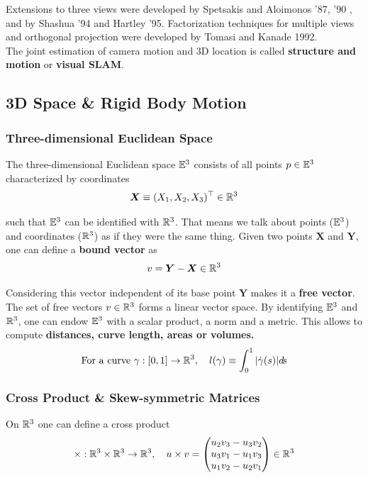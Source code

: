 Extensions to three views were developed by Spetsakis and Aloimonos '87, '90
, and by Shashua '94 and Hartley '95.
Factorization techniques for multiple views and orthogonal projection were
developed by Tomasi and Kanade 1992.\\

The joint estimation of camera motion and 3D location is called
\textbf{structure and motion} or \textbf{visual SLAM}.


\subsection{3D Space \& Rigid Body Motion}%
\label{sub:3d_space_rigid_body_motion}


\subsubsection{Three-dimensional Euclidean Space}%
\label{ssub:three_dimensional_euclidean_space}

The three-dimensional Euclidean space $\mathbb{E}^3$ consists of all points
$p \in \mathbb{E}^3$ characterized by coordinates
	\[\bm{X} \equiv (X_1, X_2, X_3)^{\top} \in \mathbb{R}^3\]

such that $\mathbb{E}^3$ can be identified with $\mathbb{R}^3$.
That means we talk about points ($\mathbb{E}^3$) and coordinates ($\mathbb{R}^3$)
as if they were the same thing. Given two points $\bm{X}$ and $\bm{Y}$,
one can define a \textbf{bound vector} as
	\[v = \bm{Y} - \bm{X} \in \mathbb{R}^3\]

Considering this vector independent of its base point $\bm{Y}$ makes
it a \textbf{free vector}. The set of free vectors $v \in \mathbb{R}^3$
forms a linear vector space. By identifying $\mathbb{E}^3$ and $\mathbb{R}^3$,
one can endow $\mathbb{E}^3$ with a scalar product, a norm and a metric.
This allows to compute \textbf{distances, curve length, areas or volumes.}
\[\text{For a curve } \gamma : [0,1] \rightarrow \mathbb{R}^3,\quad
	l(\gamma) \equiv \int_{0}^1 | \dot{\gamma}(s) | d\!s\]


\subsubsection{Cross Product \& Skew-symmetric Matrices}%
\label{ssub:cross_product_and_skew_symmetric_matrices}

On $\mathbb{R}^3$ one can define a cross product
\[\times : \mathbb{R}^3 \times \mathbb{R}^3 \rightarrow \mathbb{R}^3,\quad u \times v =
	\begin{pmatrix}
		u_2v_3 - u_3v_2 \\
		u_3v_1 - u_1v_3 \\
		u_1v_2 - u_2v_1
	\end{pmatrix} \in \mathbb{R}^3\]

